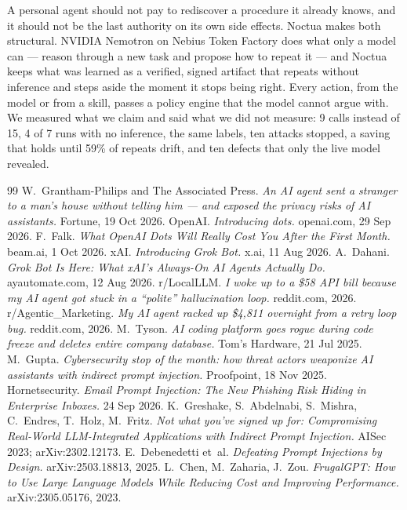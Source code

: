 \documentclass[11pt]{article}
\begin{document}
A personal agent should not pay to rediscover a procedure it already knows, and it should not be the last authority
on its own side effects. Noctua makes both structural. NVIDIA Nemotron on Nebius Token Factory does what only a
model can --- reason through a new task and propose how to repeat it --- and Noctua keeps what was learned as a
verified, signed artifact that repeats without inference and steps aside the moment it stops being right. Every
action, from the model or from a skill, passes a policy engine that the model cannot argue with. We measured what we
claim and said what we did not measure: 9 calls instead of 15, 4 of 7 runs with no inference, the same labels, ten
attacks stopped, a saving that holds until 59\% of repeats drift, and ten defects that only the live model revealed.

\begin{thebibliography}{99}\small
{} W.~Grantham-Philips and The Associated Press. \emph{An AI agent sent a stranger to a man's house without telling him --- and exposed the privacy risks of AI assistants.} Fortune, 19 Oct 2026.
 OpenAI. \emph{Introducing dots.} openai.com, 29 Sep 2026.
 F.~Falk. \emph{What OpenAI Dots Will Really Cost You After the First Month.} beam.ai, 1 Oct 2026.
 xAI. \emph{Introducing Grok Bot.} x.ai, 11 Aug 2026.
 A.~Dahani. \emph{Grok Bot Is Here: What xAI's Always-On AI Agents Actually Do.} ayautomate.com, 12 Aug 2026.
 r/LocalLLM. \emph{I woke up to a \$58 API bill because my AI agent got stuck in a ``polite'' hallucination loop.} reddit.com, 2026.
 r/Agentic\_Marketing. \emph{My AI agent racked up \$4,811 overnight from a retry loop bug.} reddit.com, 2026.
 M.~Tyson. \emph{AI coding platform goes rogue during code freeze and deletes entire company database.} Tom's Hardware, 21 Jul 2025.
 M.~Gupta. \emph{Cybersecurity stop of the month: how threat actors weaponize AI assistants with indirect prompt injection.} Proofpoint, 18 Nov 2025.
 Hornetsecurity. \emph{Email Prompt Injection: The New Phishing Risk Hiding in Enterprise Inboxes.} 24 Sep 2026.
 K.~Greshake, S.~Abdelnabi, S.~Mishra, C.~Endres, T.~Holz, M.~Fritz. \emph{Not what you've signed up for: Compromising Real-World LLM-Integrated Applications with Indirect Prompt Injection.} AISec 2023; arXiv:2302.12173.
 E.~Debenedetti et~al. \emph{Defeating Prompt Injections by Design.} arXiv:2503.18813, 2025.
 L.~Chen, M.~Zaharia, J.~Zou. \emph{FrugalGPT: How to Use Large Language Models While Reducing Cost and Improving Performance.} arXiv:2305.05176, 2023.

\end{thebibliography}
\end{document}
